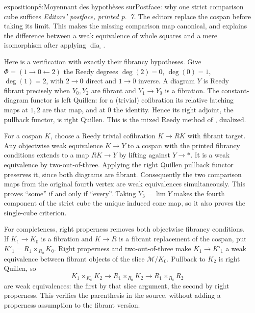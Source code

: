 \begin{dcomment}{exposition}{p8:Moyennant des hypothèses sur}{Postface: why one strict comparison cube suffices}
\emph{Editors' postface, printed p.~7.}
The editors replace the cospan before taking its limit. This makes the missing comparison map canonical, and explains the difference between a weak equivalence of whole squares and a mere isomorphism after applying $\operatorname{dia}_{\square}$.

Here is a verification with exactly their fibrancy hypotheses. Give $\Phi=(1\to0\leftarrow2)$ the Reedy degrees $\deg(2)=0$, $\deg(0)=1$, $\deg(1)=2$, with $2\to0$ direct and $1\to0$ inverse. A diagram $Y$ is Reedy fibrant precisely when $Y_0,Y_2$ are fibrant and $Y_1\to Y_0$ is a fibration. The constant-diagram functor is left Quillen: for a (trivial) cofibration its relative latching maps at $1,2$ are that map, and at $0$ the identity. Hence its right adjoint, the pullback functor, is right Quillen. This is the mixed Reedy method of \citet[Theorem~5.2.5 and the proof of Lemma~5.2.6]{Hovey1999ModelCategories}, dualized.

For a cospan $K$, choose a Reedy trivial cofibration $K\to RK$ with fibrant target. Any objectwise weak equivalence $K\to Y$ to a cospan with the printed fibrancy conditions extends to a map $RK\to Y$ by lifting against $Y\to *$. It is a weak equivalence by two-out-of-three. Applying the right Quillen pullback functor preserves it, since both diagrams are fibrant. Consequently the two comparison maps from the original fourth vertex are weak equivalences simultaneously. This proves ``some'' if and only if ``every''. Taking $Y_3=\lim Y$ makes the fourth component of the strict cube the unique induced cone map, so it also proves the single-cube criterion.

For completeness, right properness removes both objectwise fibrancy conditions. If $K_1\to K_0$ is a fibration and $K\to R$ is a fibrant replacement of the cospan, put $K'_1=R_1\times_{R_0}K_0$. Right properness and two-out-of-three make $K_1\to K'_1$ a weak equivalence between fibrant objects of the slice $\mathcal M/K_0$. Pullback to $K_2$ is right Quillen, so
\[
K_1\times_{K_0}K_2\longrightarrow
R_1\times_{R_0}K_2\longrightarrow R_1\times_{R_0}R_2
\]
are weak equivalences: the first by that slice argument, the second by right properness. This verifies the parenthesis in the source, without adding a properness assumption to the fibrant version.
\end{dcomment}

